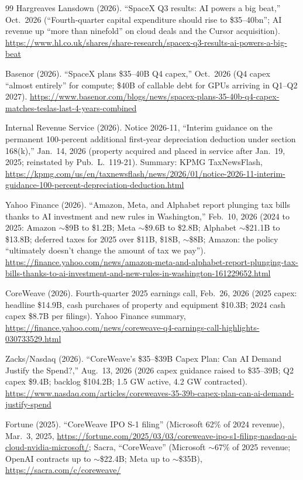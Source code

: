 \documentclass[11pt,letterpaper]{article}
\begin{document}
\begin{thebibliography}{99}
Hargreaves Lansdown (2026). ``SpaceX Q3 results: AI powers a big beat,'' Oct.~2026 (``Fourth-quarter capital expenditure should rise to \$35--40bn''; AI revenue up ``more than ninefold'' on cloud deals and the Cursor acquisition). \url{https://www.hl.co.uk/shares/share-research/spacex-q3-results-ai-powers-a-big-beat}

Basenor (2026). ``SpaceX plans \$35--40B Q4 capex,'' Oct.~2026 (Q4 capex ``almost entirely'' for compute; \$40B of callable debt for GPUs arriving in Q1--Q2 2027). \url{https://www.basenor.com/blogs/news/spacex-plans-35-40b-q4-capex-matches-teslas-last-4-years-combined}

Internal Revenue Service (2026). Notice 2026-11, ``Interim guidance on the permanent 100-percent additional first-year depreciation deduction under section 168(k),'' Jan.~14, 2026 (property acquired and placed in service after Jan.~19, 2025; reinstated by Pub.~L.~119-21). Summary: KPMG TaxNewsFlash, \url{https://kpmg.com/us/en/taxnewsflash/news/2026/01/notice-2026-11-interim-guidance-100-percent-depreciation-deduction.html}

Yahoo Finance (2026). ``Amazon, Meta, and Alphabet report plunging tax bills thanks to AI investment and new rules in Washington,'' Feb.~10, 2026 (2024 to 2025: Amazon $\sim$\$9B to \$1.2B; Meta $\sim$\$9.6B to \$2.8B; Alphabet $\sim$\$21.1B to \$13.8B; deferred taxes for 2025 over \$11B, \$18B, $\sim$\$8B; Amazon: the policy ``ultimately doesn't change the amount of tax we pay''). \url{https://finance.yahoo.com/news/amazon-meta-and-alphabet-report-plunging-tax-bills-thanks-to-ai-investment-and-new-rules-in-washington-161229652.html}

CoreWeave (2026). Fourth-quarter 2025 earnings call, Feb.~26, 2026 (2025 capex: headline \$14.9B, cash purchases of property and equipment \$10.3B; 2024 cash capex \$8.7B per filings). Yahoo Finance summary, \url{https://finance.yahoo.com/news/coreweave-q4-earnings-call-highlights-030733529.html}

Zacks/Nasdaq (2026). ``CoreWeave's \$35--\$39B Capex Plan: Can AI Demand Justify the Spend?,'' Aug.~13, 2026 (2026 capex guidance raised to \$35--39B; Q2 capex \$9.4B; backlog \$104.2B; 1.5 GW active, 4.2 GW contracted). \url{https://www.nasdaq.com/articles/coreweaves-35-39b-capex-plan-can-ai-demand-justify-spend}

Fortune (2025). ``CoreWeave IPO S-1 filing'' (Microsoft 62\% of 2024 revenue), Mar.~3, 2025, \url{https://fortune.com/2025/03/03/coreweave-ipo-s1-filing-nasdaq-ai-cloud-nvidia-microsoft/}; Sacra, ``CoreWeave'' (Microsoft $\sim$67\% of 2025 revenue; OpenAI contracts up to $\sim$\$22.4B; Meta up to $\sim$\$35B), \url{https://sacra.com/c/coreweave/}


\end{thebibliography}
\end{document}
